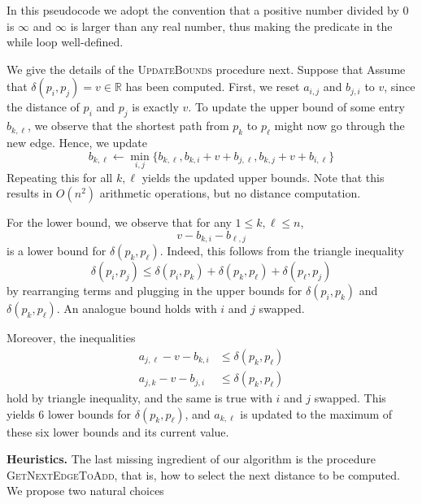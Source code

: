 \documentclass[a4paper,USenglish]{socg-lipics-v2018}
\newcommand{\R}{\mathbb{R}}
\newcommand{\eps}{\varepsilon}
\newcommand{\dist}{\delta}
\newcommand{\myparagraph}[1]{\textbf{#1.}}
\begin{document}
\begin{algorithmic}
\label{alg:blind_spanner}
\Function{BlindSpanner}{$P, \eps$}
    \While {$\exists i \neq j : b_{i,j} / a_{i,j} > 1 + \eps$}
     
    \State {$v \gets \dist(p_i, pj)$}
    \State {}
    \EndWhile
\EndFunction
\end{algorithmic}


In this pseudocode we adopt the convention that a positive number divided by 0 is $\infty$
and $\infty$ is larger than any real number,
thus making the predicate in the while loop well-defined.  

We give the details of the \textsc{UpdateBounds} procedure next.
Suppose that
Assume that $\dist(p_i,p_j)=v\in\R$ has been computed.
First, we reset $a_{i,j}$ and $b_{j,i}$ to $v$, since the distance
of $p_i$ and $p_j$ is exactly $v$.
To update the upper bound of some entry $b_{k,\ell}$,
we observe that the shortest path from $p_k$ to $p_\ell$ might now
go through the new edge. Hence, we update
\[
    b_{k,\ell}\gets \min_{i,j}\{b_{k,\ell},b_{k,i}+v+b_{j,\ell},b_{k,j}+v+b_{i,\ell}\}
\]
Repeating this for all $k,\ell$ yields the updated upper bounds.
Note that this results in $O(n^2)$ arithmetic operations,
but no distance computation.

For the lower bound, we observe that for any $1\leq k,\ell\leq n$,
\[
    v-b_{k,i}-b_{\ell,j}
\]
is a lower bound for $\dist(p_k,p_\ell)$. Indeed, this follows from
the triangle inequality
%
\[\dist(p_i,p_j)\leq \dist(p_i,p_k)+\dist(p_k,p_\ell)+\dist(p_\ell,p_j)\]
by rearranging terms and plugging in the upper bounds for $\dist(p_i,p_k)$
and $\dist(p_k,p_\ell)$. An analogue bound holds with $i$ and $j$ swapped. 

Moreover, the inequalities
\begin{align*}
  a_{j,\ell} - v - b_{k,i}&\leq \dist(p_k,p_\ell)\\
  a_{j,k} - v - b_{j,i}&\leq \dist(p_k,p_\ell)
\end{align*}
hold by triangle inequality, and the same is true with $i$ and $j$ swapped.
This yields $6$ lower bounds for $\dist(p_k,p_\ell)$, and $a_{k,\ell}$
is updated to the maximum of these six lower bounds and its current value.

\myparagraph{Heuristics}
%
The last missing ingredient of our algorithm is the procedure \textsc{GetNextEdgeToAdd},
that is, how to select the next distance to be computed. We propose two natural choices
\end{document}
